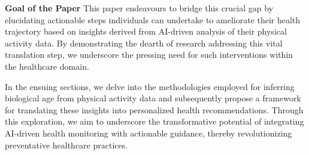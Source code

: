\textbf{Goal of the Paper} This paper endeavours to bridge this crucial gap by elucidating actionable steps individuals can undertake to ameliorate their health trajectory based on insights derived from AI-driven analysis of their physical activity data. By demonstrating the dearth of research addressing this vital translation step, we underscore the pressing need for such interventions within the healthcare domain.

In the ensuing sections, we delve into the methodologies employed for inferring biological age from physical activity data and subsequently propose a framework for translating these insights into personalized health recommendations. Through this exploration, we aim to underscore the transformative potential of integrating AI-driven health monitoring with actionable guidance, thereby revolutionizing preventative healthcare practices.
